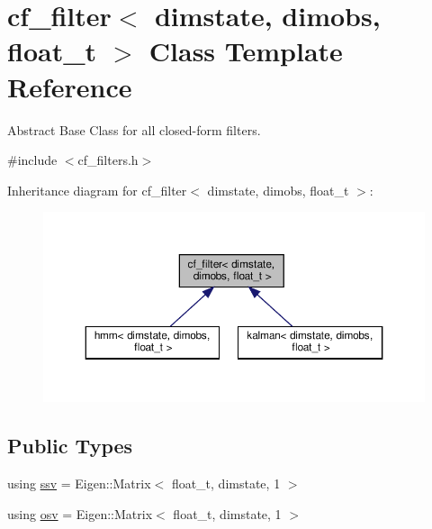 \hypertarget{classcf__filter}{}\section{cf\+\_\+filter$<$ dimstate, dimobs, float\+\_\+t $>$ Class Template Reference}
\label{classcf__filter}


Abstract Base Class for all closed-\/form filters.  




{\ttfamily \#include $<$cf\+\_\+filters.\+h$>$}



Inheritance diagram for cf\+\_\+filter$<$ dimstate, dimobs, float\+\_\+t $>$\+:
\nopagebreak
\begin{figure}[H]
\begin{center}
\leavevmode
\includegraphics[width=350pt]{classcf__filter__inherit__graph}
\end{center}
\end{figure}
\subsection*{Public Types}
\begin{DoxyCompactItemize}
\item 
using \hyperlink{classcf__filter_ad4bce534d6b7a494dae851846037c94b}{ssv} = Eigen\+::\+Matrix$<$ float\+\_\+t, dimstate, 1 $>$
\item 
using \hyperlink{classcf__filter_a91d9961b2ecd202b1400c401434b392d}{osv} = Eigen\+::\+Matrix$<$ float\+\_\+t, dimstate, 1 $>$
\end{DoxyCompactItemize}
